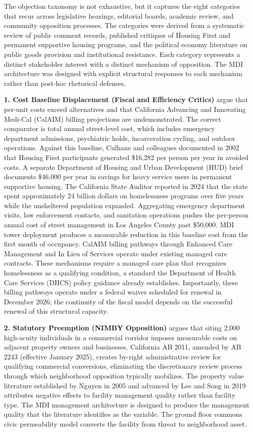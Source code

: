 \documentclass[12pt, letterpaper]{article}
\begin{document}
The objection taxonomy is not exhaustive, but it captures the eight categories that recur across legislative hearings, editorial boards, academic review, and community opposition processes. The categories were derived from a systematic review of public comment records, published critiques of Housing First and permanent supportive housing programs, and the political economy literature on public goods provision and institutional resistance. Each category represents a distinct stakeholder interest with a distinct mechanism of opposition. The MDI architecture was designed with explicit structural responses to each mechanism rather than post-hoc rhetorical defenses.

\textbf{1. Cost Baseline Displacement (Fiscal and Efficiency Critics)} argue that per-unit costs exceed alternatives and that California Advancing and Innovating Medi-Cal (CalAIM) billing projections are undemonstrated. The correct comparator is total annual street-level cost, which includes emergency department admissions, psychiatric holds, incarceration cycling, and outdoor operations. Against this baseline, Culhane and colleagues documented in 2002 that Housing First participants generated \$16,282 per person per year in avoided costs. A separate Department of Housing and Urban Development (HUD) brief documents \$46,000 per year in savings for heavy service users in permanent supportive housing. The California State Auditor reported in 2024 that the state spent approximately 24 billion dollars on homelessness programs over five years while the unsheltered population expanded. Aggregating emergency department visits, law enforcement contacts, and sanitation operations pushes the per-person annual cost of street management in Los Angeles County past \$50,000. MDI tower deployment produces a measurable reduction in this baseline cost from the first month of occupancy. CalAIM billing pathways through Enhanced Care Management and In Lieu of Services operate under existing managed care contracts. These mechanisms require a managed care plan that recognizes homelessness as a qualifying condition, a standard the Department of Health Care Services (DHCS) policy guidance already establishes. Importantly, these billing pathways operate under a federal waiver scheduled for renewal in December 2026; the continuity of the fiscal model depends on the successful renewal of this structural capacity.

\textbf{2. Statutory Preemption (NIMBY Opposition)} argues that siting 2,000 high-acuity individuals in a commercial corridor imposes measurable costs on adjacent property owners and businesses. California AB 2011, amended by AB 2243 (effective January 2025), creates by-right administrative review for qualifying commercial conversions, eliminating the discretionary review process through which neighborhood opposition typically mobilizes. The property value literature established by Nguyen in 2005 and advanced by Lee and Song in 2019 attributes negative effects to facility management quality rather than facility type. The MDI management architecture is designed to produce the management quality that the literature identifies as the variable. The ground floor commons civic permeability model converts the facility from threat to neighborhood asset.
\end{document}
